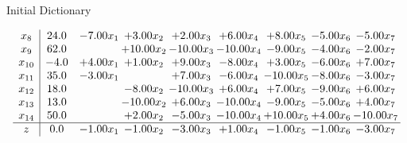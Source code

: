 \documentclass[8pt]{article}
\begin{document}
Initial Dictionary 

\[\begin{array}{c| c c@{\hskip 2pt} c@{\hskip 2pt} c@{\hskip 2pt} c@{\hskip 2pt} c@{\hskip 2pt} c@{\hskip 2pt} c@{\hskip 2pt} }
 x_{8}   &  24.0 & -7.00 x_{1} & +  3.00 x_{2} & +  2.00 x_{3} & +  6.00 x_{4} & +  8.00 x_{5} & -5.00 x_{6} & -5.00 x_{7}\\
 x_{9}   &  62.0  &   & + 10.00 x_{2} & -10.00 x_{3} & -10.00 x_{4} & -9.00 x_{5} & -4.00 x_{6} & -2.00 x_{7}\\
 x_{10}   &  -4.0 & +  4.00 x_{1} & +  1.00 x_{2} & +  9.00 x_{3} & -8.00 x_{4} & +  3.00 x_{5} & -6.00 x_{6} & +  7.00 x_{7}\\
 x_{11}   &  35.0 & -3.00 x_{1} &   & +  7.00 x_{3} & -6.00 x_{4} & -10.00 x_{5} & -8.00 x_{6} & -3.00 x_{7}\\
 x_{12}   &  18.0  &   & -8.00 x_{2} & -10.00 x_{3} & +  6.00 x_{4} & +  7.00 x_{5} & -9.00 x_{6} & +  6.00 x_{7}\\
 x_{13}   &  13.0  &   & -10.00 x_{2} & +  6.00 x_{3} & -10.00 x_{4} & -9.00 x_{5} & -5.00 x_{6} & +  4.00 x_{7}\\
 x_{14}   &  50.0  &   & +  2.00 x_{2} & -5.00 x_{3} & -10.00 x_{4} & + 10.00 x_{5} & +  4.00 x_{6} & -10.00 x_{7}\\
\hline
z    &  0.0 & -1.00 x_{1} & -1.00 x_{2} & -3.00 x_{3} & +  1.00 x_{4} & -1.00 x_{5} & -1.00 x_{6} & -3.00 x_{7}\\
\end{array}\]
\end{document}
